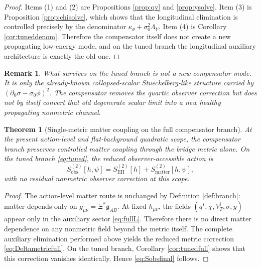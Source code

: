 \documentclass[11pt]{article}
\newcommand{\BridgeMetric}{\mathfrak{g}}
\newtheorem{remark}{Remark}
\newtheorem{theorem}{Theorem}
\begin{document}
\begin{proof}
Items (1) and (2) are Propositions \ref{prop:qv} and \ref{prop:ysolve}. Item (3) is Proposition \ref{prop:chisolve}, which shows that the longitudinal elimination is controlled precisely by the denominator \(\kappa_\theta+\sigma_0^2\Lambda_Y\). Item (4) is Corollary \ref{cor:tuneddenom}. Therefore the compensator itself does not create a new propagating low-energy mode, and on the tuned branch the longitudinal auxiliary architecture is exactly the old one.
\end{proof}

\begin{remark}
What survives on the tuned branch is not a new compensator mode. It is only the already-known collapsed-scalar Stueckelberg-like structure carried by \((\partial_0\sigma-\sigma_0\phi)^2\). The compensator removes the quartic observer correction but does not by itself convert that old degenerate scalar limit into a new healthy propagating nonmetric channel.
\end{remark}

\begin{theorem}[Single-metric matter coupling on the full compensator branch]
\label{thm:matter}
At the present action-level and flat-background quadratic scope, the compensator branch preserves controlled matter coupling through the bridge metric alone. On the tuned branch \eqref{eq:tuned}, the reduced observer-accessible action is
\begin{equation}
S_{\mathrm{obs}}^{(2)}[h,\psi]
=
S_{\mathrm{EH}}^{(2)}[h]
+S_{\mathrm{matter}}^{(2)}[h,\psi],
\label{eq:Sobsfinal}
\end{equation}
with no residual nonmetric observer correction at this scope.
\end{theorem}

\begin{proof}
The action-level matter route is unchanged by Definition \ref{def:branch}: matter depends only on \(g_{\mu\nu}=\Xi^\ast\BridgeMetric_{AB}\). At fixed \(h_{\mu\nu}\), the fields \((q^I,\chi,V_T^i,\sigma,y)\) appear only in the auxiliary sector \eqref{eq:fullL}. Therefore there is no direct matter dependence on any nonmetric field beyond the metric itself. The complete auxiliary elimination performed above yields the reduced metric correction \eqref{eq:Deltametricfull}. On the tuned branch, Corollary \ref{cor:tunedfull} shows that this correction vanishes identically. Hence \eqref{eq:Sobsfinal} follows.
\end{proof}
\end{document}
